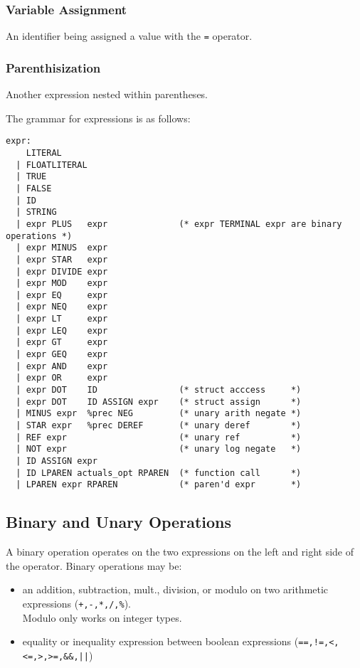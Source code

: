     \subsubsection{Variable Assignment}
      An identifier being assigned a value with the \texttt{=} operator.
    \subsubsection{Parenthisization}
      Another expression nested within parentheses.

    \bigskip\noindent The grammar for expressions is as follows:
    \begin{verbatim}
expr:
    LITERAL       
  | FLOATLITERAL     
  | TRUE          
  | FALSE            
  | ID            
  | STRING      
  | expr PLUS   expr              (* expr TERMINAL expr are binary operations *)
  | expr MINUS  expr 
  | expr STAR   expr 
  | expr DIVIDE expr 
  | expr MOD    expr 
  | expr EQ     expr 
  | expr NEQ    expr 
  | expr LT     expr 
  | expr LEQ    expr 
  | expr GT     expr 
  | expr GEQ    expr 
  | expr AND    expr 
  | expr OR     expr
  | expr DOT    ID                (* struct acccess     *)
  | expr DOT    ID ASSIGN expr    (* struct assign      *)
  | MINUS expr  %prec NEG         (* unary arith negate *)
  | STAR expr   %prec DEREF       (* unary deref        *)
  | REF expr                      (* unary ref          *)
  | NOT expr                      (* unary log negate   *)
  | ID ASSIGN expr  
  | ID LPAREN actuals_opt RPAREN  (* function call      *)
  | LPAREN expr RPAREN            (* paren'd expr       *)
    \end{verbatim}


    \subsection{Binary and Unary Operations}
      A binary operation operates on the two expressions on the left and right side of the operator. Binary operations may be:
    \begin{itemize}
      \item an addition, subtraction, mult., division, or modulo on two arithmetic expressions (\texttt{+,-,*,/,\%}).\\ Modulo only works on integer types.
      \item  equality or inequality expression between boolean expressions (\verb^==,!=,<,<=,>,>=,&&,||^)
    \end{itemize}

